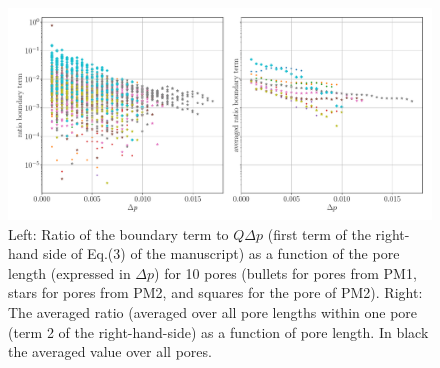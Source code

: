 \documentclass[draft,jgrga]{agutexSI2019}
\begin{document}
\begin{article}
\begin{figure}
\noindent\includegraphics[width=15cm]{figures/ratio_dissipation_term.pdf}
\caption{Left: Ratio of the boundary term to $Q\Delta p$ (first term of the right-hand side of Eq.(3) of the manuscript) as a function of the pore length (expressed in $\Delta p$) for 10 pores (bullets for pores from PM1, stars for pores from PM2, and squares for the pore of PM2). Right: The averaged ratio (averaged over all pore lengths within one pore (term 2 of the right-hand-side) as a function of pore length. In black the averaged value over all pores.}
\end{figure}





\end{article}
\end{document}
